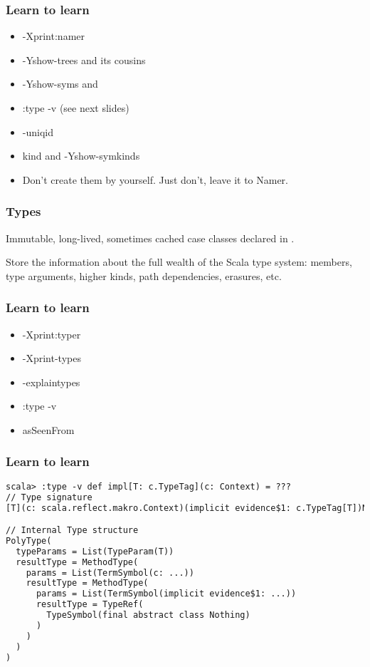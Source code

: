 \documentclass[hyperref={bookmarks=false}]{beamer}
\begin{document}
\begin{frame}[fragile]
\frametitle{Learn to learn}

\begin{itemize}
\item -Xprint:namer
\item -Yshow-trees and its cousins
\item -Yshow-syms and 
\item :type -v (see next slides)
\item -uniqid
\item kind and -Yshow-symkinds
\item Don't create them by yourself. Just don't, leave it to Namer.
\end{itemize}

\end{frame}

\begin{frame}[fragile]
\frametitle{Types}

Immutable, long-lived, sometimes cached case classes declared in .

Store the information about the full wealth of the Scala type system:
members, type arguments, higher kinds, path dependencies, erasures, etc.

\end{frame}

\begin{frame}[fragile]
\frametitle{Learn to learn}

\begin{itemize}
\item -Xprint:typer
\item -Xprint-types
\item -explaintypes
\item :type -v
\item asSeenFrom
\end{itemize}

\end{frame}

\begin{frame}[fragile]
\frametitle{Learn to learn}

\begin{lstlisting}[language=XML]
scala> :type -v def impl[T: c.TypeTag](c: Context) = ???
// Type signature
[T](c: scala.reflect.makro.Context)(implicit evidence$1: c.TypeTag[T])Nothing

// Internal Type structure
PolyType(
  typeParams = List(TypeParam(T))
  resultType = MethodType(
    params = List(TermSymbol(c: ...))
    resultType = MethodType(
      params = List(TermSymbol(implicit evidence$1: ...))
      resultType = TypeRef(
        TypeSymbol(final abstract class Nothing)
      )
    )
  )
)
\end{lstlisting}
\end{frame}
\end{document}
